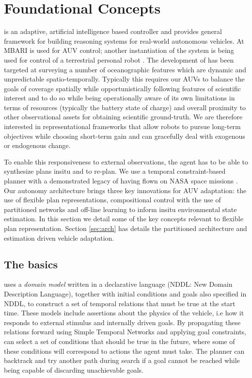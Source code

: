 \section{Foundational Concepts}
\label{sec:concepts}

\rx is an adaptive, artificial intelligence based controller and
provides general framework for building reasoning systems for
real-world autonomous vehicles. At MBARI \rx is used for AUV control;
another instantiation of the system is being used for control of a
terrestrial personal robot \cite{pr2, Meeussen:2010dn}. The
development of \rx has been targeted at surveying a number of
oceanographic features which are dynamic and unpredictable
spatio-temporally. Typically this requires our AUVs to balance the
goals of coverage spatially while opportunistically following features
of scientific interest and to do so while being operationally aware of
its own limitations in terms of resources (typically the battery state
of charge) and overall proximity to other observational assets for
obtaining scientific ground-truth. We are therefore interested in
representational frameworks that allow robots to pursue long-term
objectives while choosing short-term gain and can gracefully deal with
exogenous or endogenous change.

To enable this responsiveness to external observations, the agent has
to be able to synthesize plans insitu and to re-plan. We use a
temporal constraint-based planner \eu with a demonstrated legacy of
having flown on NASA space missions \cite{jonsson00,bresina05,
  barreiro09}. Our autonomy architecture brings three key innovations
for AUV adaptation: the use of flexible plan representations,
compositional control with the use of partitioned networks and
off-line learning to inform insitu environmental state estimation. In
this section we detail some of the key concepts relevant to flexible
plan representation. Section \ref{sec:arch} has details the
\rx partitioned architecture and estimation driven vehicle
adaptation.

\subsection{The basics}
\label{sec:basics}

\eu uses a \emph{domain model} written in a declarative language
(NDDL: New Domain Description Language), together with initial
conditions and goals also specified in NDDL, to construct a set of
temporal relations that must be true at the start time. These models
include assertions about the physics of the vehicle, i.e how it
responds to external stimulus and internally driven goals. By
propagating these relations forward using Simple Temporal Networks
\cite{dechter91} and applying goal constraints, \eu can select a set
of conditions that should be true in the future, where some of these
conditions will correspond to actions the agent must take. The planner
can backtrack and try another path during search if a goal cannot be
reached while being capable of discarding unachievable goals.

